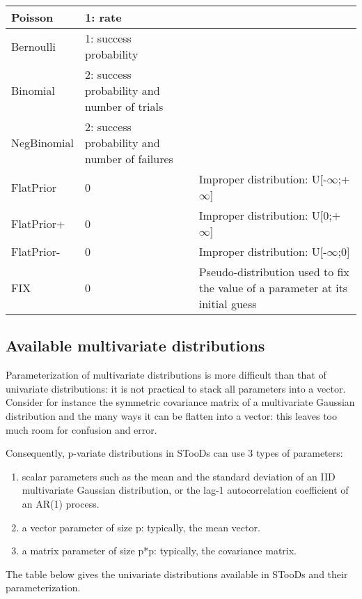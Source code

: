 \documentclass[a4paper]{article}
\begin{document}
\begin{tabular}{|p{2.5cm}|p{7.5cm}|p{6cm}|}
		\hline
		Poisson & 1: rate &  \\
		\hline
		Bernoulli & 1: success probability &  \\
		\hline
		Binomial & 2: success probability and number of trials &  \\
		\hline
		NegBinomial & 2: success probability and number of failures &  \\
		\hline
		FlatPrior & 0 & Improper distribution: U[-$\infty$;+$\infty$] \\
		\hline
		FlatPrior+ & 0 & Improper distribution: U[0;+$\infty$] \\
		\hline
		FlatPrior- & 0 & Improper distribution: U[-$\infty$;0] \\
		\hline
		 FIX & 0 & Pseudo-distribution used to fix the value of a parameter at its initial guess \\
		\hline
	\end{tabular}
	
	\subsection{Available multivariate distributions} \label{mdistributions}
	
	Parameterization of multivariate distributions is more difficult than that of univariate distributions: it is not practical to stack all parameters into a vector. Consider for instance the symmetric covariance matrix of a multivariate Gaussian distribution and the many ways it can be flatten into a vector: this leaves too much room for confusion and error.
	
	Consequently, p-variate distributions in STooDs can use 3 types of parameters: 
	\begin{enumerate}
		\item scalar parameters such as the mean and the standard deviation of an IID multivariate Gaussian distribution, or the lag-1 autocorrelation coefficient of an AR(1) process.
		\item a vector parameter of size p: typically, the mean vector.
		\item a matrix parameter of size p*p: typically, the covariance matrix.
	\end{enumerate}

	The table below gives the univariate distributions available in STooDs and their parameterization.
	
\end{document}
